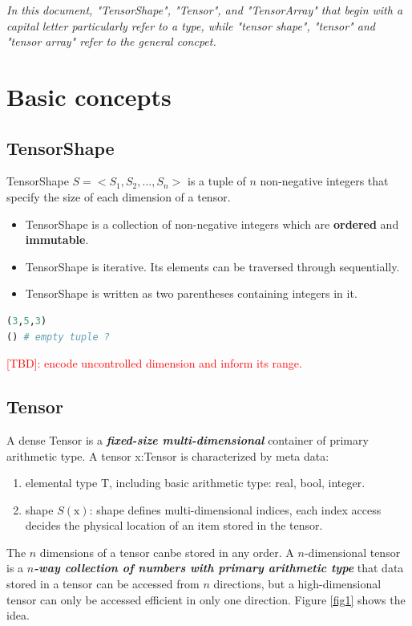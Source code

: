 \textit{In this document, "TensorShape", "Tensor", and "TensorArray" that begin with a capital letter particularly refer to a type, while "tensor shape", "tensor" and "tensor array" refer to the general concpet.}

\section{Basic concepts}

\subsection{TensorShape}

TensorShape $S=<S_1,S_2,...,S_n>$ is a tuple of $n$ non-negative integers that specify the size of each dimension of a tensor.

\begin{itemize}
  \item TensorShape is a collection of non-negative integers which are \textbf{ordered} and \textbf{immutable}.
  \item TensorShape is iterative. Its elements can be traversed through sequentially.
  \item TensorShape is written as two parentheses containing integers in it.
\end{itemize}

\begin{lstlisting}[language=Python]
(3,5,3)
() # empty tuple ?
\end{lstlisting}

\textcolor{red}{[TBD]: encode uncontrolled dimension and inform its range.}

\subsection{Tensor}

A dense Tensor is a \textbf{\textit{fixed-size multi-dimensional}} container of primary arithmetic type. A tensor x:Tensor is characterized by meta data:
\begin{enumerate}
  \item elemental type T, including basic arithmetic type: real, bool, integer.
  \item shape $S(\text{x})$: shape defines multi-dimensional indices, each index access decides the physical location of an item stored in the tensor.
\end{enumerate}

The $n$ dimensions of a tensor canbe stored in any order. A $n$-dimensional tensor is a \textbf{\textit{$n$-way collection of numbers with primary arithmetic type}} that data stored in a tensor can be accessed from $n$ directions, but a high-dimensional tensor can only be accessed efficient in only one direction. Figure \ref{fig1} shows the idea.

